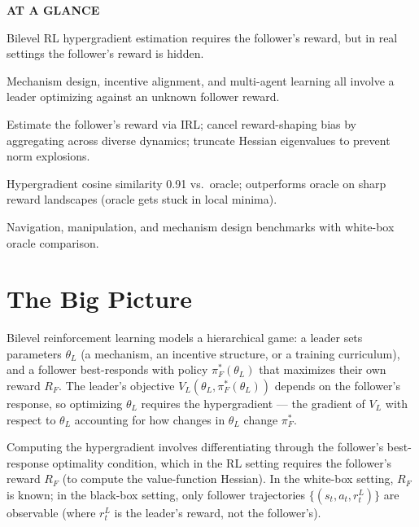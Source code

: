 \documentclass[10pt,twocolumn]{article}
\begin{document}
\begin{mdframed}[backgroundcolor=boxgray,linecolor=rulered,linewidth=1pt,
    innerleftmargin=6pt,innerrightmargin=6pt,
    innertopmargin=6pt,innerbottommargin=6pt]
\textbf{\small AT A GLANCE}\par\vspace{4pt}
\begin{description}[leftmargin=0pt,labelsep=4pt,itemsep=2pt,parsep=0pt,
    font=\small\bfseries]
  \item[Problem:] Bilevel RL hypergradient estimation requires the follower's
    reward, but in real settings the follower's reward is hidden.
  \item[Why it matters:] Mechanism design, incentive alignment, and multi-agent
    learning all involve a leader optimizing against an unknown follower reward.
  \item[Method:] Estimate the follower's reward via IRL; cancel reward-shaping
    bias by aggregating across diverse dynamics; truncate Hessian eigenvalues
    to prevent norm explosions.
  \item[Result:] Hypergradient cosine similarity 0.91 vs.\ oracle; outperforms
    oracle on sharp reward landscapes (oracle gets stuck in local minima).
  \item[Evidence:] Navigation, manipulation, and mechanism design benchmarks with
    white-box oracle comparison.
\end{description}
\end{mdframed}

\section{The Big Picture}

Bilevel reinforcement learning models a hierarchical game: a leader sets
parameters $\theta_L$ (a mechanism, an incentive structure, or a training
curriculum), and a follower best-responds with policy $\pi_F^*(\theta_L)$
that maximizes their own reward $R_F$. The leader's objective $V_L(\theta_L,
\pi_F^*(\theta_L))$ depends on the follower's response, so optimizing $\theta_L$
requires the hypergradient --- the gradient of $V_L$ with respect to $\theta_L$
accounting for how changes in $\theta_L$ change $\pi_F^*$.

Computing the hypergradient involves differentiating through the follower's
best-response optimality condition, which in the RL setting requires the
follower's reward $R_F$ (to compute the value-function Hessian). In the
white-box setting, $R_F$ is known; in the black-box setting, only follower
trajectories $\{(s_t, a_t, r_t^L)\}$ are observable (where $r_t^L$ is the
leader's reward, not the follower's).
\end{document}
